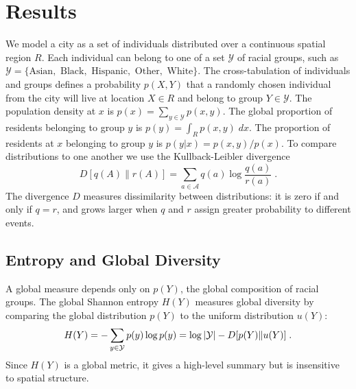 \documentclass[9pt,twocolumn,twoside]{pnas-new}
\begin{document}
\section*{Results}
	We model a city as a set of individuals distributed over a continuous spatial region $R$. 
	Each individual can belong to one of a set $\mathcal{Y}$ of racial groups, such as $\mathcal{Y} = \{\text{Asian}, \text{ Black}, \text{ Hispanic}, \text{ Other}, \text{ White}\}$. 
	The cross-tabulation of individuals and groups defines a probability $p(X,Y)$ that a randomly chosen individual from the city will live at location $X \in R$ and belong to group $Y \in \mathcal{Y}$. 
	The population density at $x$ is $p(x) = \sum_{y \in \mathcal{Y}} p(x,y)$. 
	The global proportion of residents belonging to group $y$ is $p(y) = \int_R p(x,y)\; dx$. 
	The proportion of residents at $x$ belonging to group $y$ is $p(y|x) = p(x,y) / p(x)$. 
	To compare distributions to one another we use the Kullback-Leibler divergence 
	\begin{equation}
		D[q(A)\|r(A)] = \sum_{a \in \mathcal{A}} q(a) \log \frac{q(a)}{r(a)}\;.
	\end{equation}
	The divergence $D$ measures dissimilarity between distributions: it is zero if and only if $q = r$, and grows larger when $q$ and $r$ assign greater probability to different events. 

	

\subsection*{Entropy and Global Diversity}
	A global measure depends only on $p(Y)$, the global composition of racial groups. 
	The global Shannon entropy $H(Y)$ measures global diversity by comparing the global distribution $p(Y)$ to the uniform distribution $u(Y)$: 
	\begin{equation}
		H(Y) = -\sum_{y \in \mathcal{Y}}p(y) \log p(y) = \log \left|\mathcal{Y}\right| - D[p(Y)\|u(Y)]\;.
	\end{equation}
	Since $H(Y)$ is a global metric, it gives a high-level summary but is insensitive to spatial structure. 
\end{document}
